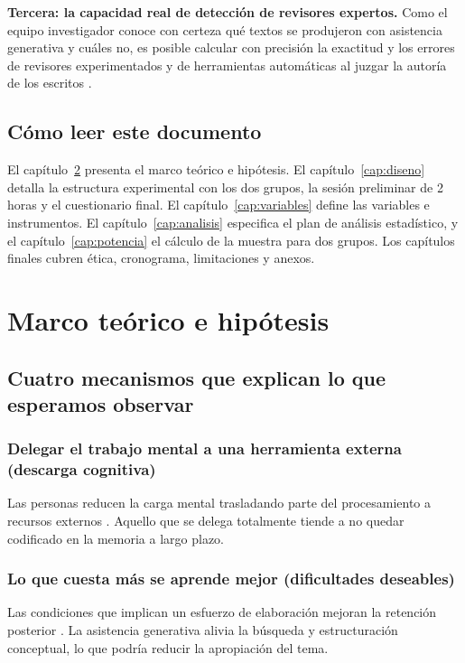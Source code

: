 \documentclass[12pt,a4paper,openany]{report}
\begin{document}
    \textbf{Tercera: la capacidad real de detecci\'on de revisores expertos.} Como el equipo investigador conoce con certeza qu\'e textos se produjeron con asistencia generativa y cu\'ales no, es posible calcular con precisi\'on la exactitud y los errores de revisores experimentados y de herramientas autom\'aticas al juzgar la autor\'ia de los escritos \citep{perkins2024detection}.
    
    \section{C\'omo leer este documento}
    
    El cap\'itulo~\ref{cap:marco} presenta el marco te\'orico e hip\'otesis. El cap\'itulo~\ref{cap:diseno} detalla la estructura experimental con los dos grupos, la sesi\'on preliminar de 2 horas y el cuestionario final. El cap\'itulo~\ref{cap:variables} define las variables e instrumentos. El cap\'itulo~\ref{cap:analisis} especifica el plan de an\'alisis estad\'istico, y el cap\'itulo~\ref{cap:potencia} el c\'alculo de la muestra para dos grupos. Los cap\'itulos finales cubren \'etica, cronograma, limitaciones y anexos.
    
    \chapter{Marco te\'orico e hip\'otesis}
    \label{cap:marco}
    
    \section{Cuatro mecanismos que explican lo que esperamos observar}
    
    \subsection{Delegar el trabajo mental a una herramienta externa (descarga cognitiva)}
    Las personas reducen la carga mental trasladando parte del procesamiento a recursos externos \citep{risko2016cognitive}. Aquello que se delega totalmente tiende a no quedar codificado en la memoria a largo plazo.
    
    \subsection{Lo que cuesta m\'as se aprende mejor (dificultades deseables)}
    Las condiciones que implican un esfuerzo de elaboraci\'on mejoran la retenci\'on posterior \citep{bjork2013self}. La asistencia generativa alivia la b\'usqueda y estructuraci\'on conceptual, lo que podr\'ia reducir la apropiaci\'on del tema.
    
\end{document}
